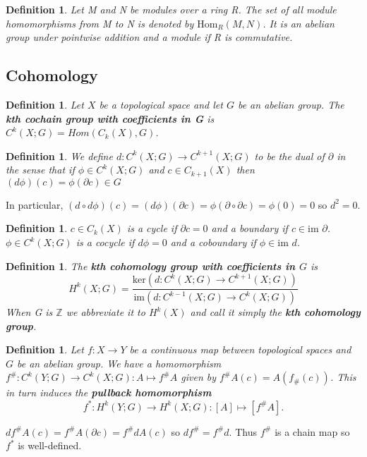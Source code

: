 \documentclass{article}
\newtheorem{definition}[theorem]{Definition}
\begin{document}
\begin{definition}
Let M and N be modules over a ring R. The set of all module homomorphisms from M to N is denoted by $\text{Hom}_R(M,N)$. It is an abelian group under pointwise addition and a module if R is commutative.
\end{definition}



\subsection{Cohomology}
\begin{definition}
Let $X$ be a topological space and let $G$ be an abelian group. The \textbf{kth cochain group with coefficients in G} is $C^k(X;G)=Hom(C_k(X),G)$. 
\end{definition}

\begin{definition}
We define $d\colon C^k(X;G)\to C^{k+1}(X;G)$ to be the dual of $\partial$ in the sense that if $\phi\in C^k(X;G)$ and $c\in C_{k+1}(X)$ then $(d\phi)(c)=\phi(\partial c)\in G$
\end{definition}

\noindent In particular, $(d\circ d\phi)(c)=(d\phi)(\partial c)=\phi(\partial\circ\partial c)=\phi(0)=0$ so $d^2=0$.

\begin{definition}
$c\in C_k(X)$ is a cycle if $\partial c=0$ and a boundary if $c\in\text{im }\partial$.
$\phi\in C^k(X;G)$ is a cocycle if $d\phi=0$ and a coboundary if $\phi\in\text{im }d$.
\end{definition}

\begin{definition}
The \textbf{kth cohomology group with coefficients in $G$} is \[H^k(X;G)=\frac{\text{ker}(d\colon C^k(X;G)\to C^{k+1}(X;G))}{\text{im}(d\colon C^{k-1}(X;G)\to C^k(X;G))}\] When G is $\mathbb{Z}$ we abbreviate it to $H^k(X)$ and call it simply the \textbf{kth cohomology group}.
\end{definition}

\begin{definition}
Let $f\colon X\to Y$ be a continuous map between topological spaces and $G$ be an abelian group. We have a homomorphism $f^\#\colon C^k(Y;G)\to C^k(X;G):A\mapsto f^\# A$ given by $f^\# A(c)=A(f_\#(c))$. This in turn induces the \textbf{pullback homomorphism} \[f^*\colon H^k(Y;G)\to H^k(X;G):[A]\mapsto [f^\# A].\]
\end{definition}
\noindent $df^\# A(c)=f^\# A(\partial c)=f^\# dA(c)$ so $df^\#=f^\# d$. Thus $f^\#$ is a chain map so $f^*$ is well-defined.
\end{document}
